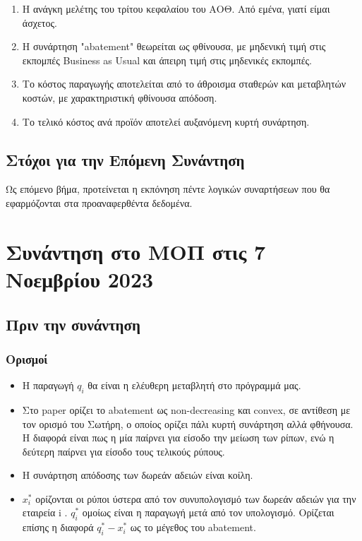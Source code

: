 \documentclass[a4paper,twoside,10pt]{article}
\begin{document}
\begin{enumerate}
	\item Η ανάγκη μελέτης του τρίτου κεφαλαίου του ΑΟΘ. Από εμένα, γιατί είμαι άσχετος.
	\item Η συνάρτηση "abatement" θεωρείται ως φθίνουσα, με μηδενική τιμή στις εκπομπές Business as Usual και άπειρη τιμή στις μηδενικές εκπομπές.
	\item Το κόστος παραγωγής αποτελείται από το άθροισμα σταθερών και μεταβλητών κοστών, με χαρακτηριστική φθίνουσα απόδοση.
	\item Το τελικό κόστος ανά προϊόν αποτελεί αυξανόμενη κυρτή συνάρτηση.
\end{enumerate}

\subsection{Στόχοι για την Επόμενη Συνάντηση}
Ως επόμενο βήμα, προτείνεται η εκπόνηση πέντε λογικών συναρτήσεων που θα εφαρμόζονται στα προαναφερθέντα δεδομένα.

\section{Συνάντηση στο ΜΟΠ στις 7 Νοεμβρίου 2023}

\subsection{Πριν την συνάντηση}
\subsubsection{Ορισμοί}
\begin{itemize}
	\item Η παραγωγή $q_i$ θα είναι η ελέυθερη μεταβλητή στο πρόγραμμά μας.
	\item Στο paper ορίζει το abatement ως non-decreasing και convex, σε αντίθεση με τον ορισμό του Σωτήρη, ο οποίος ορίζει πάλι κυρτή συνάρτηση αλλά φθήνουσα. Η διαφορά είναι πως η μία παίρνει για είσοδο την μείωση των ρίπων, ενώ η δεύτερη παίρνει για είσοδο τους τελικούς ρύπους. 
	\item Η συνάρτηση απόδοσης των δωρεάν αδειών είναι κοίλη.
	\item $x_i^*$ ορίζονται οι ρύποι ύστερα από τον συνυπολογισμό των δωρεάν αδειών για την εταιρεία i . $q_i^*$ ομοίως είναι η παραγωγή μετά από τον υπολογισμό. Ορίζεται επίσης η διαφορά $q_i^* - x_i^*$ ως το μέγεθος του abatement. 
\end{itemize}
\end{document}
